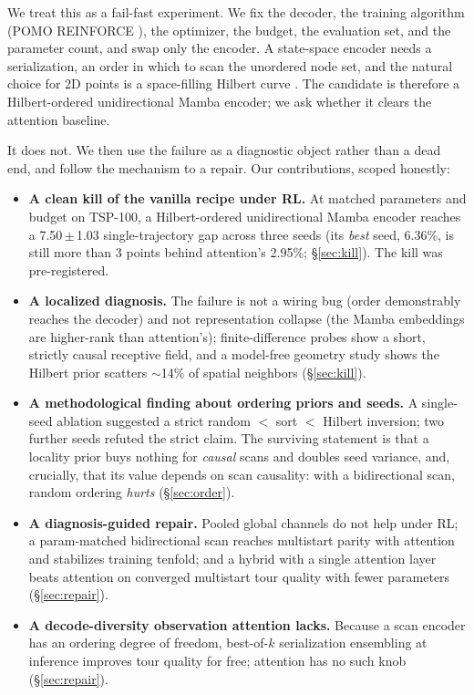 \documentclass[11pt]{article}
\newcommand{\pct}{\%}
\begin{document}
We treat this as a fail-fast experiment. We fix the decoder, the training
algorithm (POMO REINFORCE \citep{pomo2020,williams1992}), the optimizer, the
budget, the evaluation set, and the parameter count, and swap only the encoder.
A state-space encoder needs a serialization, an order in which to scan the
unordered node set, and the natural choice for 2D points is a space-filling
Hilbert curve \citep{hilbert1891,ptv3-2024}. The candidate is therefore a
Hilbert-ordered unidirectional Mamba encoder; we ask whether it clears the
attention baseline.

It does not. We then use the failure as a diagnostic object rather than a dead
end, and follow the mechanism to a repair. Our contributions, scoped honestly:

\begin{itemize}
  \item \textbf{A clean kill of the vanilla recipe under RL.} At matched
  parameters and budget on TSP-100, a Hilbert-ordered unidirectional Mamba
  encoder reaches a 7.50\,$\pm$\,1.03 single-trajectory gap across three seeds
  (its \emph{best} seed, 6.36\pct, is still more than 3 points behind
  attention's 2.95\pct; \S\ref{sec:kill}). The kill was pre-registered.
  \item \textbf{A localized diagnosis.} The failure is not a wiring bug (order
  demonstrably reaches the decoder) and not representation collapse (the Mamba
  embeddings are higher-rank than attention's); finite-difference probes show a
  short, strictly causal receptive field, and a model-free geometry study shows
  the Hilbert prior scatters $\sim$14\pct{} of spatial neighbors (\S\ref{sec:kill}).
  \item \textbf{A methodological finding about ordering priors and seeds.} A
  single-seed ablation suggested a strict random $<$ sort $<$ Hilbert inversion;
  two further seeds refuted the strict claim. The surviving statement is that a
  locality prior buys nothing for \emph{causal} scans and doubles seed variance,
  and, crucially, that its value depends on scan causality: with a bidirectional
  scan, random ordering \emph{hurts} (\S\ref{sec:order}).
  \item \textbf{A diagnosis-guided repair.} Pooled global channels do not help
  under RL; a param-matched bidirectional scan reaches multistart parity with
  attention and stabilizes training tenfold; and a hybrid with a single attention
  layer beats attention on converged multistart tour quality with fewer
  parameters (\S\ref{sec:repair}).
  \item \textbf{A decode-diversity observation attention lacks.} Because a scan
  encoder has an ordering degree of freedom, best-of-$k$ serialization ensembling
  at inference improves tour quality for free; attention has no such knob
  (\S\ref{sec:repair}).
\end{itemize}
\end{document}
